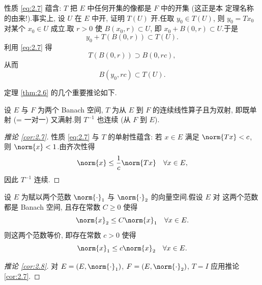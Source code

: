 \begin{remark}
\label{rem:2.5}
性质 \eqref{eq:2.7} 蕴含: $T$ 把 $E$ 中任何开集的像都是 $F$ 中的开集 (这正是本
定理名称的由来!).事实上, 设 $U$ 在 $E$ 中开, 证明 $T(U)$ 开.任取
$y_0\in T(U)$, 则 $y_0=Tx_0$ 对某个 $x_0\in U$ 成立.取 $r>0$ 使
$B(x_0,r)\subset U$, 即 $x_0+B(0,r)\subset U$.于是
\begin{equation*}
y_0+T(B(0,r))\subset T(U).
\end{equation*}
利用 \eqref{eq:2.7} 得
\begin{equation*}
T(B(0,r))\supset B(0,rc),
\end{equation*}
从而
\begin{equation*}
B(y_0,rc)\subset T(U).
\end{equation*}
\end{remark}

定理  \ref{thm:2.6} 的几个重要推论如下.

\begin{keycorollary}
\label{cor:2.7}
设 $E$ 与 $F$ 为两个 Banach 空间, $T$ 为从 $E$ 到 $F$ 的连续线性算子且为双射,
即既单射 (= 一对一) 又满射.则 $T^{-1}$ 也连续 (从 $F$ 到 $E$).
\end{keycorollary}

\begin{proof}[推论 \ref{cor:2.7}]
性质 \eqref{eq:2.7} 与 $T$ 的单射性蕴含: 若 $x\in E$ 满足 $\norm{Tx}<c$, 则
$\norm{x}<1$.由齐次性得
\begin{equation*}
\norm{x}\le\frac{1}{c}\norm{Tx}\quad \forall x\in E,
\end{equation*}
因此 $T^{-1}$ 连续.
\end{proof}

\begin{corollary}
\label{cor:2.8}
设 $E$ 为赋以两个范数 $\norm{\cdot}_1$ 与 $\norm{\cdot}_2$ 的向量空间.假设 $E$ 对
这两个范数都是 Banach 空间, 且存在常数 $C\ge0$ 使得
\begin{equation*}
\norm{x}_2\le C\norm{x}_1\quad \forall x\in E.
\end{equation*}
则这两个范数等价, 即存在常数 $c>0$ 使得
\begin{equation*}
\norm{x}_1\le c\norm{x}_2\quad \forall x\in E.
\end{equation*}
\end{corollary}

\begin{proof}[推论 \ref{cor:2.8}]
对 $E=(E,\norm{\cdot}_1)$, $F=(E,\norm{\cdot}_2)$, $T=I$ 应用推论  \ref{cor:2.7}.
\end{proof}


